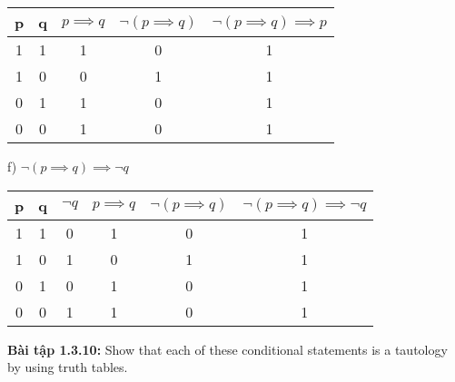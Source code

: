 \documentclass[a4paper]{article}
\begin{document}
\begin{enumerate}
\begin{table} [h]
\begin{tabular} {|c|c|c|c|c|}
			\hline
			p&q&$p \implies q$&$\lnot (p \implies q)$&$\lnot (p \implies q) \implies p$\\
			\hline
			1&1&1&0&1\\
			1&0&0&1&1\\
			0&1&1&0&1\\
			0&0&1&0&1\\
			\hline
		\end{tabular}
		\item[f)] $\lnot(p \implies q) \implies \lnot q$
		\centering
		\begin{tabular} {|c|c|c|c|c|c|}
			\hline
			p&q&$\lnot q$&$p \implies q$&$\lnot (p \implies q)$&$\lnot(p \implies q) \implies \lnot q$\\
			\hline
			1&1&0&1&0&1\\
			1&0&1&0&1&1\\
			0&1&0&1&0&1\\
			0&0&1&1&0&1\\
			\hline
		\end{tabular}
	\end{table}
\end{enumerate}
\textbf{Bài tập 1.3.10:} Show that each of these conditional statements is a tautology by using truth tables.
\end{document}
